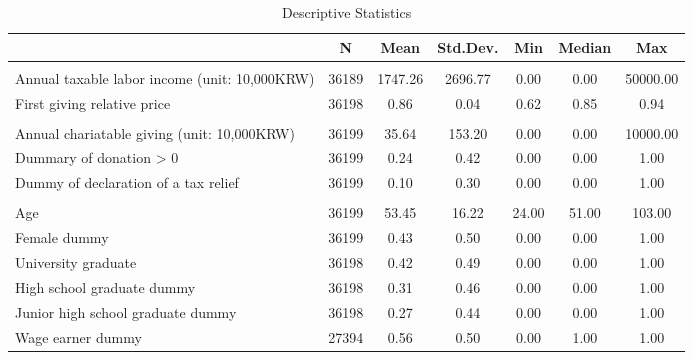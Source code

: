 \documentclass[
  11pt,
  a4paper,
]{article}
\begin{document}
\begin{table}
\caption{\label{tab:SummaryCovariate}Descriptive Statistics}
\centering
\fontsize{9}{11}\selectfont
\begin{tabular}[t]{lcccccc}
\toprule
  & N & Mean & Std.Dev. & Min & Median & Max\\
\midrule
\addlinespace[0.3em]
\multicolumn{7}{l}{\textbf{Income and giving price}}\\
\hspace{1em}Annual taxable labor income (unit: 10,000KRW) & 36189 & \num{1747.26} & \num{2696.77} & \num{0.00} & \num{0.00} & \num{50000.00}\\
\hspace{1em}First giving relative price & 36198 & \num{0.86} & \num{0.04} & \num{0.62} & \num{0.85} & \num{0.94}\\
\addlinespace[0.3em]
\multicolumn{7}{l}{\textbf{Charitable giving}}\\
\hspace{1em}Annual chariatable giving (unit: 10,000KRW) & 36199 & \num{35.64} & \num{153.20} & \num{0.00} & \num{0.00} & \num{10000.00}\\
\hspace{1em}Dummary of donation > 0 & 36199 & \num{0.24} & \num{0.42} & \num{0.00} & \num{0.00} & \num{1.00}\\
\hspace{1em}Dummy of declaration of a tax relief & 36199 & \num{0.10} & \num{0.30} & \num{0.00} & \num{0.00} & \num{1.00}\\
\addlinespace[0.3em]
\multicolumn{7}{l}{\textbf{Individual Characteristics}}\\
\hspace{1em}Age & 36199 & \num{53.45} & \num{16.22} & \num{24.00} & \num{51.00} & \num{103.00}\\
\hspace{1em}Female dummy & 36199 & \num{0.43} & \num{0.50} & \num{0.00} & \num{0.00} & \num{1.00}\\
\hspace{1em}University graduate & 36198 & \num{0.42} & \num{0.49} & \num{0.00} & \num{0.00} & \num{1.00}\\
\hspace{1em}High school graduate dummy & 36198 & \num{0.31} & \num{0.46} & \num{0.00} & \num{0.00} & \num{1.00}\\
\hspace{1em}Junior high school graduate dummy & 36198 & \num{0.27} & \num{0.44} & \num{0.00} & \num{0.00} & \num{1.00}\\
\hspace{1em}Wage earner dummy & 27394 & \num{0.56} & \num{0.50} & \num{0.00} & \num{1.00} & \num{1.00}\\
\bottomrule
\end{tabular}
\end{table}
\end{document}

